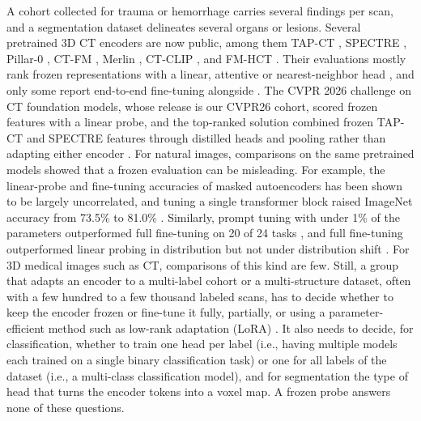 A cohort collected for trauma or hemorrhage carries several findings per scan, and a segmentation dataset delineates several organs or lesions. Several pretrained 3D CT encoders are now public, among them TAP-CT \citep{veenboer2025tapct}, SPECTRE \citep{claessens2025spectre}, Pillar-0 \citep{agrawal2025pillar0}, CT-FM \citep{pai2025ctfm}, Merlin \citep{blankemeier2026merlin}, CT-CLIP \citep{hamamci2026ctrate}, and FM-HCT \citep{zhu2025fmct}. Their evaluations mostly rank frozen representations with a linear, attentive or nearest-neighbor head \citep{veenboer2025tapct,claessens2025spectre}, and only some report end-to-end fine-tuning alongside \citep{pai2025ctfm,zhu2025fmct}. The CVPR 2026 challenge on CT foundation models, whose release is our CVPR26 cohort, scored frozen features with a linear probe, and the top-ranked solution combined frozen TAP-CT and SPECTRE features through distilled heads and pooling rather than adapting either encoder \citep{veenboer2026patches}. For natural images, comparisons on the same pretrained models showed that a frozen evaluation can be misleading. For example, the linear-probe and fine-tuning accuracies of masked autoencoders has been shown to be largely uncorrelated, and tuning a single transformer block raised ImageNet accuracy from 73.5\% to 81.0\% \citep{he2022mae}. Similarly, prompt tuning with under 1\% of the parameters outperformed full fine-tuning on 20 of 24 tasks \citep{jia2022vpt}, and full fine-tuning outperformed linear probing in distribution but not under distribution shift \citep{kumar2022lpft}. For 3D medical images such as CT, comparisons of this kind are few. Still, a group that adapts an encoder to a multi-label cohort or a multi-structure dataset, often with a few hundred to a few thousand labeled scans, has to decide whether to keep the encoder frozen or fine-tune it fully, partially, or using a parameter-efficient method such as low-rank adaptation (LoRA) \citep{hu2022lora}. It also needs to decide, for classification, whether to train one head per label (i.e., having multiple models each trained on a single binary classification task) or one for all labels of the dataset (i.e., a multi-class classification model), and for segmentation the type of head that turns the encoder tokens into a voxel map. A frozen probe answers none of these questions.

